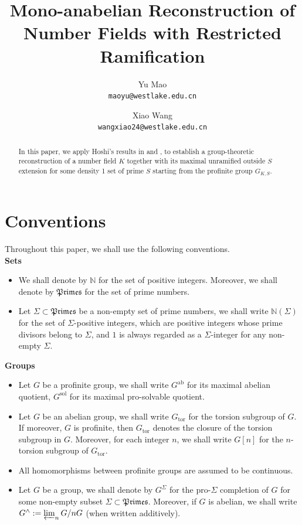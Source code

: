 \documentclass{article}
\title{Mono-anabelian Reconstruction of Number Fields with Restricted Ramification}
\author{Yu Mao\\
\texttt{maoyu@westlake.edu.cn}
\and
Xiao Wang \\ 
\texttt{wangxiao24@westlake.edu.cn}
}
\date{}
\theoremstyle{plain}
\theoremstyle{definition}
\theoremstyle{remark}
\begin{document}
\maketitle
\begin{abstract}
In this paper, we apply Hoshi's results in \cite{Ho1} and \cite{Ho2}, to establish a group-theoretic reconstruction of a number field $K$ together with its maximal unramified outside $S$ extension for some density 1 set of prime $S$ starting from the profinite group $G_{K,S}$.
\end{abstract}
\newpage
\tableofcontents
\newpage
\section*{Conventions}
Throughout this paper, we shall use the following conventions. \\
\textbf{Sets}
\begin{itemize}
    \item We shall denote by $\mathbb N$ for the set of positive integers. Moreover, we shall denote by $\mathfrak{Primes}$ for the set of prime numbers.
    \item Let $\Sigma \subset \mathfrak{Primes}$ be a non-empty set of prime numbers, we shall write $\mathbb N(\Sigma)$ for the set of $\Sigma$-positive integers, which are positive integers whose prime divisors belong to $\Sigma$, and $1$ is always regarded as a $\Sigma$-integer for any non-empty $\Sigma$.
\end{itemize}
\textbf{Groups}
\begin{itemize}
    \item Let $G$ be a profinite group, we shall write $G^{\text{ab}}$ for its maximal abelian quotient, $G^{\text{sol}}$ for its maximal pro-solvable quotient.
    \item Let $G$ be an abelian group, we shall write $G_{\text{tor}}$ for the torsion subgroup of $G$. If moreover, $G$ is profinite, then $G_{\text{tor}}$ denotes the closure of the torsion subgroup in $G$. Moreover, for each integer $n$, we shall write $G[n]$ for the $n$-torsion subgroup of $G_{\text{tor}}$. 
    \item All homomorphisms between profinite groups are assumed to be continuous. 
    \item Let $G$ be a group, we shall denote by $G^{\Sigma}$ for the pro-$\Sigma$ completion of $G$ for some non-empty subset $\Sigma \subset \mathfrak{Primes}$. Moreover, if $G$ is abelian, we shall write $G^{\wedge} := \varprojlim_n G/nG$ (when written additively).
\end{itemize}
\end{document}
